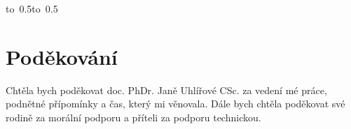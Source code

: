 \documentclass[12pt,a4paper,singleside,openright]{report}
\let\openright=\cleardoublepage
\begin{document}
	\vspace{10mm}

	\hbox{\hbox to 0.5\hbox to 0.5}

	\vspace{20mm}
\newpage

	\openright

	\textcolor{white}{ }
	\vspace{150mm}

	\section*{Poděkování}

	Chtěla bych poděkovat doc. PhDr. Janě Uhlířové CSc. za vedení mé práce, podnětné přípomínky a čas, který mi věnovala.
	Dále bych chtěla poděkovat své rodině za morální podporu a příteli za podporu technickou. 

\newpage

\end{document}
